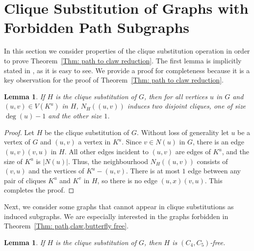 \documentclass[12pt]{article}
\newtheorem{lemma}[theorem]{Lemma}
\theoremstyle{definition}
\begin{document}
\section{Clique Substitution of Graphs with Forbidden Path Subgraphs}

In this section we consider properties of the clique substitution  operation in order to prove Theorem~\ref{Thm: path to claw reduction}.
The first lemma is implicitly stated in \cite{joret2010cops}, as it is easy to see. We provide a proof for completeness because it is a key observation for the proof of Theorem~\ref{Thm: path to claw reduction}.

\begin{lemma}\label{Lemma: Clique-Sub Neighbourhood}
    If $H$ is the clique substitution  of $G$, then for all vertices $u$ in $G$ and $(u,v) \in V(K^u)$ in $H$, 
    $N_H((u,v))$ induces two disjoint cliques, one of size $\deg(u) - 1$ and the other size $1$.
\end{lemma}

\begin{proof}
    Let $H$ be the clique substitution  of $G$.
    Without loss of generality 
    let $u$ be a vertex of $G$ and $(u,v)$ a vertex in $K^u$.
    Since $v \in N(u)$ in $G$, there is an edge $(u,v)(v,u)$ in $H$.
    All other edges incident to $(u,v)$ are edges of $K^u$, and the size of $K^u$ is $|N(u)|$.
    Thus, the neighbourhood $N_H((u,v))$ consists of $(v,u)$ and the vertices of $K^u - (u,v)$. 
    There is at most $1$ edge between any pair of cliques $K^u$ and $K^v$ in $H$,
    so there is no edge $(u,x)(v,u)$.
    This completes the proof.
\end{proof}

Next, we consider some graphs that cannot appear in clique substitutions as induced subgraphs.
We are especially interested in the graphs forbidden in Theorem~\ref{Thm: path,claw,butterfly free}.

\begin{lemma}\label{Lemma: Clique-Sub C_4,C_5 free}
    If $H$ is the clique substitution  of $G$, then $H$ is $(C_4,C_5)$-free.
\end{lemma}
\end{document}
